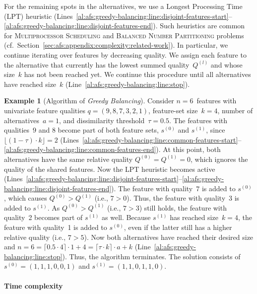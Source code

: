 \documentclass{article}
\theoremstyle{definition}
\newtheorem{example}{Example}
\begin{document}
For the remaining spots in the alternatives, we use a Longest Processing Time (LPT) heuristic (Lines~\ref{al:afs:greedy-balancing:line:disjoint-features-start}--\ref{al:afs:greedy-balancing:line:disjoint-features-end}).
Such heuristics are common for \textsc{Multiprocessor Scheduling} and \textsc{Balanced Number Partitioning} problems~\cite{babel1998thek, chen20023partitioning, lawrinenko2018reduction} (cf.~Section~\ref{sec:afs:appendix:complexity:related-work}).
In particular, we continue iterating over features by decreasing quality.
We assign each feature to the alternative that currently has the lowest summed quality~$Q^{(l)}$ and whose size~$k$ has not been reached yet.
We continue this procedure until all alternatives have reached size~$k$ (Line~\ref{al:afs:greedy-balancing:line:stop}).
%
\begin{example}[Algorithm of \emph{Greedy Balancing}]
	Consider $n=6$~features with univariate feature qualities $q = (9,8,7,3,2,1)$, feature-set size~$k=4$, number of alternatives~$a=1$, and dissimilarity threshold~$\tau = 0.5$.
	The features with qualities~$9$ and $8$ become part of both feature sets, $s^{(0)}$ and $s^{(1)}$, since $\lfloor (1 - \tau) \cdot k \rfloor = 2$ (Lines~\ref{al:afs:greedy-balancing:line:common-features-start}--\ref{al:afs:greedy-balancing:line:common-features-end}).
	At this point, both alternatives have the same relative quality $Q^{(0)} = Q^{(1)} = 0$, which ignores the quality of the shared features.
	Now the LPT heuristic becomes active (Lines~\ref{al:afs:greedy-balancing:line:disjoint-features-start}--\ref{al:afs:greedy-balancing:line:disjoint-features-end}).
	The feature with quality~$7$ is added to $s^{(0)}$, which causes $Q^{(0)} > Q^{(1)}$ (i.e., $7 > 0$).
	Thus, the feature with quality~3 is added to $s^{(1)}$.
	As $Q^{(0)} > Q^{(1)}$ (i.e., $7 > 3$) still holds, the feature with quality~2 becomes part of $s^{(1)}$ as well.
	Because $s^{(1)}$ has reached size~$k = 4$, the feature with quality~1 is added to $s^{(0)}$, even if the latter still has a higher relative quality (i.e., $7 > 5$).
	Now both alternatives have reached their desired size and $n = 6 = \lceil 0.5 \cdot 4 \rceil \cdot 1 + 4 = \lceil \tau \cdot k \rceil \cdot a + k$ (Line~\ref{al:afs:greedy-balancing:line:stop}).
	Thus, the algorithm terminates.
	The solution consists of $s^{(0)} = (1,1,1,0,0,1)$ and $s^{(1)} = (1,1,0,1,1,0)$.
	\label{ex:afs:greedy-balancing:algorithm}
\end{example}

\paragraph{Time complexity}
\end{document}
